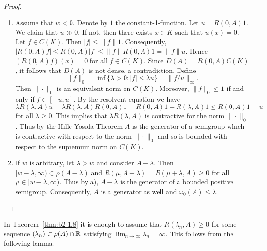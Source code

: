 \begin{proof} 
\begin{enumerate}[\upshape (i), wide, labelindent=.5em]
\item \label{thm:b2-1.8-1}
Assume that $w < 0$.
Denote by $1$ the constant-1-function.
Let $u = R(0,A)1$.
We claim that $u \gg 0$.
If not, then there exists $x \in K$ such that $u(x) = 0$.
Let $f \in C(K)$.
Then $|f| \leq \|f\|1$.
Consequently, $|R(0,A)f| \leq R(0,A)|f| \leq \|f\|R(0,A)1 = \|f\|u$.
Hence $(R(0,A)f)(x) = 0$ for all $f \in C(K)$.
Since $D(A) = R(0,A)C(K)$, it follows that $D(A)$ is not dense, a contradiction.
Define 
\[\|f\|_{0} = \inf \{\lambda > 0 : |f| \leq \lambda u\} = \|f/u\|_{\infty}.
\]
Then $\|\cdot\|_{0}$ is an equivalent norm on $C(K)$.
Moreover, $\|f\|_{0} \leq 1$ if and only if $f \in [-u,u]$.
By the resolvent equation we have 
\[
\lambda R(\lambda,A)u = \lambda R(\lambda,A)R(0,A)1 = R(0,A)1 - R(\lambda,A)1 \leq R(0,A)1 = u 
\]
for all $\lambda \geq 0$.
This implies that $\lambda R(\lambda,A)$ is contractive for the norm $\|\cdot\|_{0}$.
Thus by the Hille-Yosida Theorem $A$ is the generator of a semigroup which is contractive with respect to the norm $\|\cdot\|_{0}$ and so is bounded with respect to the supremum norm on $C(K)$.

\item \label{thm:b2-1.8-2}
If $w$ is arbitrary, let $\lambda > w$ and consider $A - \lambda$.
Then $[w-\lambda,\infty) \subset \rho(A-\lambda)$ and $R(\mu,A-\lambda) = R(\mu+\lambda,A) \geq 0$ for all $\mu \in [w-\lambda,\infty)$.
Thus by a), $A - \lambda$ is the generator of a bounded positive semigroup.
Consequently, $A$ is a generator as well and $\omega_{0}(A) \leq \lambda$.
\end{enumerate}
\end{proof}
In Theorem~\ref{thm:b2-1.8} it is enough to assume that $R(\lambda_{n},A) \geq 0$ for some sequence 
 $(\lambda_{n}) \subset \rho(A) \cap \mathbb{R}$ satisfying $\lim_{n \to \infty} \lambda_{n} = \infty$.
This follows from the following lemma.

